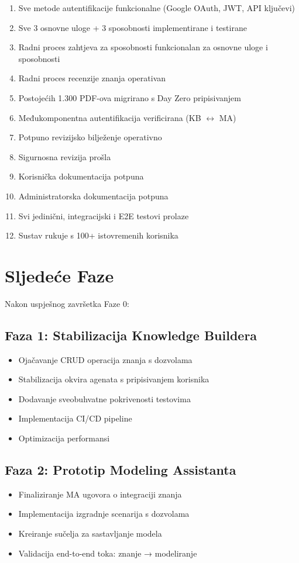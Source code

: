 \documentclass[12pt,a4paper]{article}
\begin{document}
\begin{enumerate}
    \item Sve metode autentifikacije funkcionalne (Google OAuth, JWT, API ključevi)
    \item Sve 3 osnovne uloge + 3 sposobnosti implementirane i testirane
    \item Radni proces zahtjeva za sposobnosti funkcionalan za osnovne uloge i sposobnosti
    \item Radni proces recenzije znanja operativan
    \item Postojećih 1.300 PDF-ova migrirano s Day Zero pripisivanjem
    \item Međukomponentna autentifikacija verificirana (KB $\leftrightarrow$ MA)
    \item Potpuno revizijsko bilježenje operativno
    \item Sigurnosna revizija prošla
    \item Korisnička dokumentacija potpuna
    \item Administratorska dokumentacija potpuna
    \item Svi jedinični, integracijski i E2E testovi prolaze
    \item Sustav rukuje s 100+ istovremenih korisnika
\end{enumerate}

\section{Sljedeće Faze}

Nakon uspješnog završetka Faze 0:

\subsection{Faza 1: Stabilizacija Knowledge Buildera}
\begin{itemize}
    \item Ojačavanje CRUD operacija znanja s dozvolama
    \item Stabilizacija okvira agenata s pripisivanjem korisnika
    \item Dodavanje sveobuhvatne pokrivenosti testovima
    \item Implementacija CI/CD pipeline
    \item Optimizacija performansi
\end{itemize}

\subsection{Faza 2: Prototip Modeling Assistanta}
\begin{itemize}
    \item Finaliziranje MA ugovora o integraciji znanja
    \item Implementacija izgradnje scenarija s dozvolama
    \item Kreiranje sučelja za sastavljanje modela
    \item Validacija end-to-end toka: znanje → modeliranje
\end{itemize}
\end{document}
